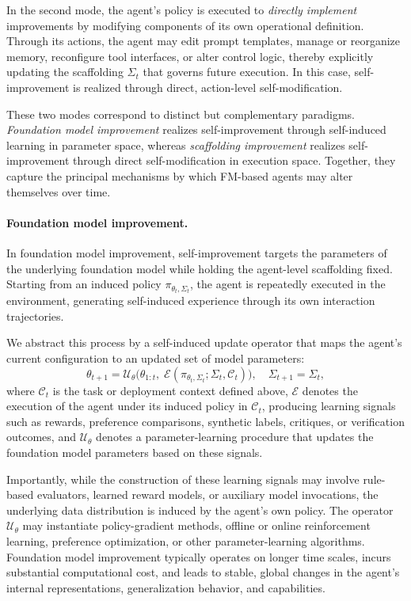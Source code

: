 \documentclass{article}
\begin{document}
In the second mode, the agent’s policy is executed to \emph{directly implement} improvements by modifying components of its own operational definition. Through its actions, the agent may edit prompt templates, manage or reorganize memory, reconfigure tool interfaces, or alter control logic, thereby explicitly updating the scaffolding $\Sigma_t$ that governs future execution. In this case, self-improvement is realized through direct, action-level self-modification.

These two modes correspond to distinct but complementary paradigms. \emph{Foundation model improvement} realizes self-improvement through self-induced learning in parameter space, whereas \emph{scaffolding improvement} realizes self-improvement through direct self-modification in execution space. Together, they capture the principal mechanisms by which FM-based agents may alter themselves over time.

\paragraph{Foundation model improvement.}
In foundation model improvement, self-improvement targets the parameters of the underlying foundation model while holding the agent-level scaffolding fixed. Starting from an induced policy $\pi_{\theta_t, \Sigma_t}$, the agent is repeatedly executed in the environment, generating self-induced experience through its own interaction trajectories.

We abstract this process by a self-induced update operator that maps the agent’s current configuration to an updated set of model parameters:
\begin{equation}
\theta_{t+1} = \mathcal{U}_\theta\bigl(\theta_{1:t},\; \mathcal{E}(\pi_{\theta_t, \Sigma_t};\Sigma_t,\mathcal{C}_t)\bigr), \quad \Sigma_{t+1} = \Sigma_t,
\end{equation}
where $\mathcal{C}_t$ is the task or deployment context defined above, $\mathcal{E}$ denotes the execution of the agent under its induced policy in $\mathcal{C}_t$, producing learning signals such as rewards, preference comparisons, synthetic labels, critiques, or verification outcomes, and $\mathcal{U}_\theta$ denotes a parameter-learning procedure that updates the foundation model parameters based on these signals.

Importantly, while the construction of these learning signals may involve rule-based evaluators, learned reward models, or auxiliary model invocations, the underlying data distribution is induced by the agent’s own policy. The operator $\mathcal{U}_\theta$ may instantiate policy-gradient methods, offline or online reinforcement learning, preference optimization, or other parameter-learning algorithms. Foundation model improvement typically operates on longer time scales, incurs substantial computational cost, and leads to stable, global changes in the agent’s internal representations, generalization behavior, and capabilities.
\end{document}
